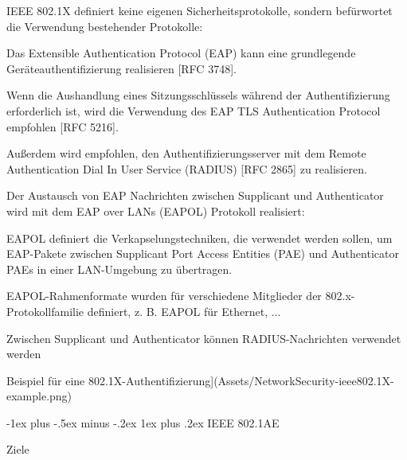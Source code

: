 \documentclass[a4paper]{article}
\makeatletter
\renewcommand{\subsubsection}{\@startsection{subsubsection}{3}{0mm}%
 {-1ex plus -.5ex minus -.2ex}%
 {1ex plus .2ex}%
 {\normalfont\small\bfseries}}
\makeatother
\begin{document}
\begin{multicols}{3}
      \begin{itemize*}
            \item IEEE 802.1X definiert keine eigenen Sicherheitsprotokolle, sondern
            befürwortet die Verwendung bestehender Protokolle:
            \begin{itemize*}
                  \item Das Extensible Authentication Protocol (EAP) kann eine grundlegende Geräteauthentifizierung realisieren {[}RFC 3748{]}.
                  \item Wenn die Aushandlung eines Sitzungsschlüssels während der Authentifizierung erforderlich ist, wird die Verwendung des EAP TLS Authentication Protocol empfohlen {[}RFC 5216{]}.
                  \item Außerdem wird empfohlen, den Authentifizierungsserver mit dem Remote Authentication Dial In User Service (RADIUS) {[}RFC 2865{]} zu realisieren.
            \end{itemize*}
            \item Der Austausch von EAP Nachrichten zwischen Supplicant und
            Authenticator wird mit dem EAP over LANs (EAPOL) Protokoll realisiert:
            \begin{itemize*}
                  \item EAPOL definiert die Verkapselungstechniken, die verwendet werden sollen, um EAP-Pakete zwischen Supplicant Port Access Entities (PAE) und Authenticator PAEs in einer LAN-Umgebung zu übertragen.
                  \item EAPOL-Rahmenformate wurden für verschiedene Mitglieder der 802.x-Protokollfamilie definiert, z. B. EAPOL für Ethernet, ...
                  \item Zwischen Supplicant und Authenticator können RADIUS-Nachrichten verwendet werden
            \end{itemize*}
      \end{itemize*}

      Beispiel für eine
      802.1X-Authentifizierung{]}(Assets/NetworkSecurity-ieee802.1X-example.png)


      \subsubsection{IEEE 802.1AE}

      Ziele


\end{multicols}
\end{document}
